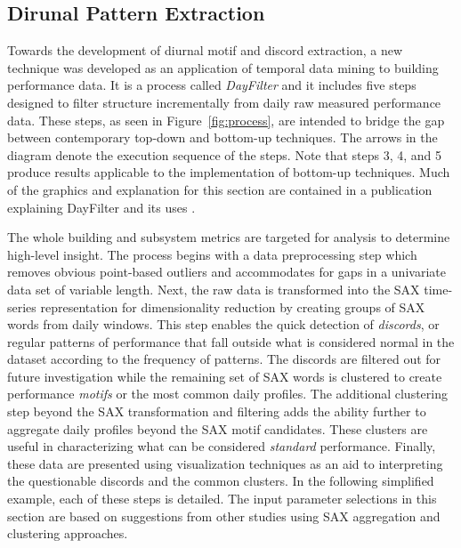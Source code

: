 
\subsection{Dirunal Pattern Extraction}
\label{sec:dayfilter}

Towards the development of diurnal motif and discord extraction, a new technique was developed as an application of temporal data mining to building performance data. It is a process called \emph{DayFilter} and it includes five steps designed to filter structure incrementally from daily raw measured performance data. These steps, as seen in Figure~\ref{fig:process}, are intended to bridge the gap between contemporary top-down and bottom-up techniques. The arrows in the diagram denote the execution sequence of the steps. Note that steps 3, 4, and 5 produce results applicable to the implementation of bottom-up techniques. Much of the graphics and explanation for this section are contained in a publication explaining DayFilter and its uses \citep{miller_automated_2015}.

The whole building and subsystem metrics are targeted for analysis to determine high-level insight. The process begins with a data preprocessing step which removes obvious point-based outliers and accommodates for gaps in a univariate data set of variable length. Next, the raw data is transformed into the SAX time-series representation for dimensionality reduction by creating groups of SAX words from daily windows. This step enables the quick detection of \emph{discords}, or regular patterns of performance that fall outside what is considered normal in the dataset according to the frequency of patterns. The discords are filtered out for future investigation while the remaining set of SAX words is clustered to create performance \emph{motifs} or the most common daily profiles. The additional clustering step beyond the SAX transformation and filtering adds the ability further to aggregate daily profiles beyond the SAX motif candidates. These clusters are useful in characterizing what can be considered \emph{standard} performance. Finally, these data are presented using visualization techniques as an aid to interpreting the questionable discords and the common clusters. In the following simplified example, each of these steps is detailed. The input parameter selections in this section are based on suggestions from other studies using SAX aggregation and clustering approaches. 

